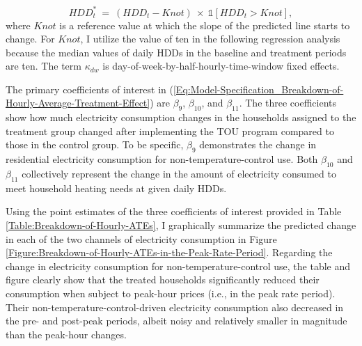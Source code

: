 \begin{equation}
HDD_{t}^{*} \ = \ (HDD_{t} - Knot) \ \times \ \mathbb{1}[HDD_{t} > Knot],
\end{equation}
where $Knot$ is a reference value at which the slope of the predicted line starts to change. For $Knot$, I utilize the value of ten in the following regression analysis because the median values of daily HDDs in the baseline and treatment periods are ten. The term $\kappa_{dw}$ is day-of-week-by-half-hourly-time-window fixed effects. 

The primary coefficients of interest in (\ref{Eq:Model-Specification_Breakdown-of-Hourly-Average-Treatment-Effect}) are $\beta_{9}$, $\beta_{10}$, and $\beta_{11}$. The three coefficients show how much electricity consumption changes in the households assigned to the treatment group changed after implementing the TOU program compared to those in the control group. To be specific, $\beta_{9}$ demonstrates the change in residential electricity consumption for non-temperature-control use. Both $\beta_{10}$ and $\beta_{11}$ collectively represent the change in the amount of electricity consumed to meet household heating needs at given daily HDDs. 

Using the point estimates of the three coefficients of interest provided in Table \ref{Table:Breakdown-of-Hourly-ATEs}, I graphically summarize the predicted change in each of the two channels of electricity consumption in Figure \ref{Figure:Breakdown-of-Hourly-ATEs-in-the-Peak-Rate-Period}. Regarding the change in electricity consumption for non-temperature-control use, the table and figure clearly show that the treated households significantly reduced their consumption when subject to peak-hour prices (i.e., in the peak rate period). Their non-temperature-control-driven electricity consumption also decreased in the pre- and post-peak periods, albeit noisy and relatively smaller in magnitude than the peak-hour changes. 

